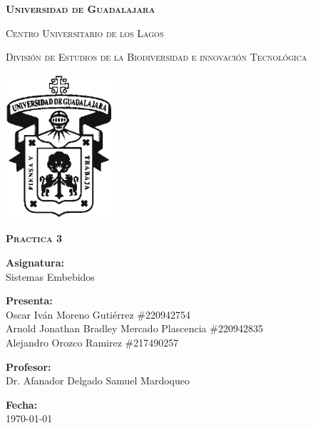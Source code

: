 \documentclass[12pt]{report}
\begin{document}
\setlength{\hoffset}{27 pt} %
\begin{titlepage}
{\centering
{\scshape\bfseries\fontsize{29.16}{34.992}\selectfont Universidad de Guadalajara \par}
\vspace{0.5cm}
{\scshape\Large Centro Universitario de los Lagos \par}
\vspace{1cm}
{\scshape\Large División de Estudios de la Biodiversidad e innovación Tecnológica \par}
\vspace{1cm}
{\graphicspath{{imagenes/Portada}} %
\includegraphics[width=0.3\textwidth]{image.png}\par}
\vspace{1cm}
{\scshape\large\bfseries Practica 3 \par}
\vspace{1.5cm}
{\large \textbf{Asignatura:} \\Sistemas Embebidos\par}
\vfill
{\large \textbf{Presenta:} \\Oscar Iván Moreno Gutiérrez \#220942754
\\Arnold Jonathan Bradley Mercado Plascencia \#220942835
\\Alejandro Orozco Ramirez \#217490257  \par}
\vfill
{\large \textbf{Profesor:} \\Dr. Afanador Delgado Samuel Mardoqueo \par}
\vfill
\vfill
\begin{flushright}
  {\normalsize \textbf {Fecha:} \\ \today}
\end{flushright}
\vfill}
{\large  \par}
\end{titlepage}
\end{document}
